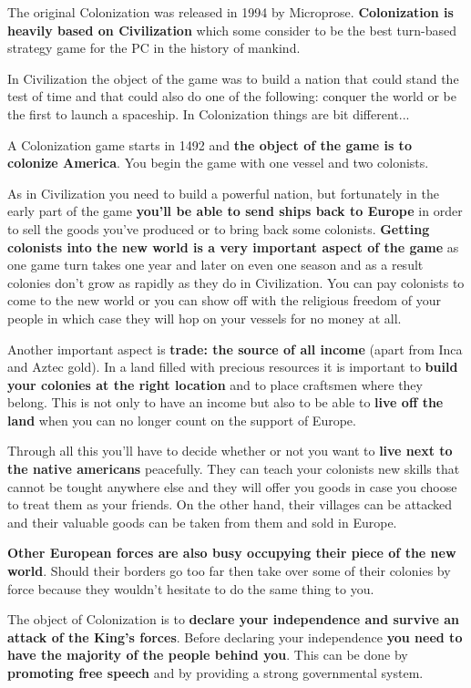 \documentclass[12pt]{book}
\begin{document}
The original Colonization was
released in 1994 by Microprose. \textbf{Colonization is heavily based
on Civilization} which some consider to be the best turn-based
strategy game for the PC in the history of mankind.

In Civilization the object of the game was to build a nation that
could stand the test of time and that could also do one of the
following: conquer the world or be the first to launch a
spaceship. In Colonization things are bit different...

A Colonization game starts in 1492 and \textbf{the object of the game
is to colonize America}. You begin the game with one vessel and two
colonists.

As in Civilization you need to build a powerful nation, but
fortunately in the early part of the game \textbf{you'll be able to
send ships back to Europe} in order to sell the goods you've produced
or to bring back some colonists. \textbf{Getting colonists into the
new world is a very important aspect of the game} as one game turn
takes one year and later on even one season and as a result colonies
don't grow as rapidly as they do in Civilization. You can pay
colonists to come to the new world or you can show off with the
religious freedom of your people in which case they will hop on your
vessels for no money at all.

Another important aspect is \textbf{trade: the source of all income}
(apart from Inca and Aztec gold). In a land filled with precious
resources it is important to \textbf{build your colonies at the right
location} and to place craftsmen where they belong. This is not only
to have an income but also to be able to \textbf{live off the land}
when you can no longer count on the support of Europe.

Through all this you'll have to decide whether or not you want to
\textbf{live next to the native americans} peacefully. They can teach
your colonists new skills that cannot be tought anywhere else and they
will offer you goods in case you choose to treat them as your
friends. On the other hand, their villages can be attacked and their
valuable goods can be taken from them and sold in Europe.

\textbf{Other European forces are also busy occupying their piece of
the new world}. Should their borders go too far then take over some
of their colonies by force because they wouldn't hesitate to do the
same thing to you.

The object of Colonization is to \textbf{declare your independence and
survive an attack of the King's forces}. Before declaring your
independence \textbf{you need to have the majority of the people
behind you}. This can be done by \textbf{promoting free speech} and by
providing a strong governmental system.
\end{document}
